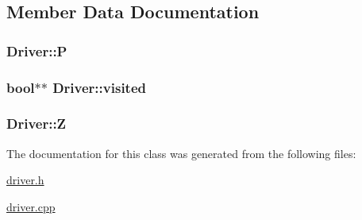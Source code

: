 \subsection{Member Data Documentation}
\subsubsection[{\texorpdfstring{P}{P}}]{ Driver\+::P}\hypertarget{classDriver_a967bca94eece374e66e7ed827f22cf51}{}\label{classDriver_a967bca94eece374e66e7ed827f22cf51}
\subsubsection[{\texorpdfstring{visited}{visited}}]{\setlength{\rightskip}{0pt plus 5cm}bool$\ast$$\ast$ Driver\+::visited}\hypertarget{classDriver_ab338d327140ab7a1a9469d5c16c2697f}{}\label{classDriver_ab338d327140ab7a1a9469d5c16c2697f}
\subsubsection[{\texorpdfstring{Z}{Z}}]{ Driver\+::Z}\hypertarget{classDriver_a15f54a382cba3cdcf82c396cecfa3f9e}{}\label{classDriver_a15f54a382cba3cdcf82c396cecfa3f9e}


The documentation for this class was generated from the following files\+:\begin{DoxyCompactItemize}
\item 
\hyperlink{driver_8h}{driver.\+h}\item 
\hyperlink{driver_8cpp}{driver.\+cpp}\end{DoxyCompactItemize}
